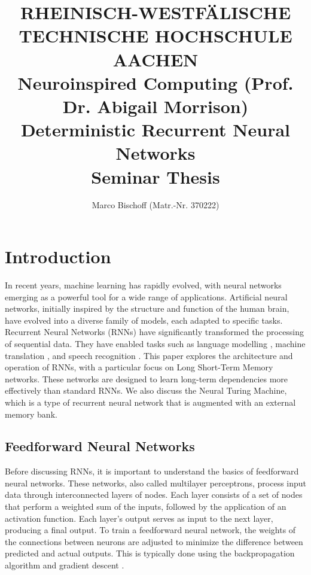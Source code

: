 \documentclass{article}
\title{
  {\bf \scriptsize
    RHEINISCH-WESTF\"ALISCHE TECHNISCHE HOCHSCHULE AACHEN \\
    Neuroinspired Computing (Prof. Dr. Abigail Morrison)
  } \vspace{2cm} \\
  Deterministic Recurrent Neural Networks \\
  {\large Seminar Thesis} 
}
\author{Marco Bischoff (Matr.-Nr. 370222)}
\begin{document}
\pagestyle{headings}

\maketitle
\newpage

\tableofcontents
\newpage



\section{Introduction}
\label{ch:1}

In recent years, machine learning has rapidly evolved, with neural networks emerging as a
powerful tool for a wide range of applications. Artificial neural networks, initially
inspired by the structure and function of the human brain, have evolved into a diverse
family of models, each adapted to specific tasks. Recurrent Neural Networks (RNNs) have
significantly transformed the processing of sequential data. They have enabled tasks such
as language modelling \cite{merity2017regularizing}, machine translation
\cite{choLearningPhraseRepresentations2014}, and speech recognition
\cite{graves2013speech}. This paper explores the architecture and operation of RNNs, with
a particular focus on Long Short-Term Memory networks. These networks are designed to
learn long-term dependencies more effectively than standard RNNs. We also discuss the
Neural Turing Machine, which is a type of recurrent neural network that is augmented with
an external memory bank.


\subsection{Feedforward Neural Networks}
\label{sec:1.0}

Before discussing RNNs, it is important to understand the basics of feedforward neural
networks. These networks, also called multilayer perceptrons, process input data through
interconnected layers of nodes. Each layer consists of a set of nodes that perform a
weighted sum of the inputs, followed by the application of an activation function. Each
layer's output serves as input to the next layer, producing a final output. To train a
feedforward neural network, the weights of the connections between neurons are adjusted to
minimize the difference between predicted and actual outputs. This is typically done using
the backpropagation algorithm and gradient descent \cite{mitchell_machine_1997}.
\end{document}
